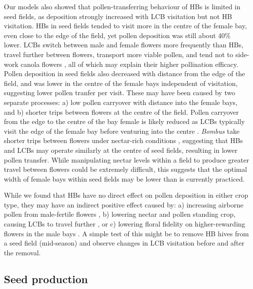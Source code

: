 \documentclass[12pt]{article} %
\begin{document}
Our models also showed that pollen-transferring behaviour of HBs is limited in seed fields, as deposition strongly increased with LCB visitation but not HB visitation.
HBs in seed fields tended to visit more in the centre of the female bay, even close to the edge of the field, yet pollen deposition was still about 40\% lower.
LCBs switch between male and female flowers more frequently than HBs, travel further between flowers, transport more viable pollen, and tend not to side-work canola flowers \citep{soroka2001, parker2015, waytesMsc, brunet2019}, all of which may explain their higher pollination efficacy.
Pollen deposition in seed fields also decreased with distance from the edge of the field, and was lower in the centre of the female bays independent of visitation, suggesting lower pollen tranfer per visit.
These may have been caused by two separate processes: a) low pollen carryover with distance into the female bays, and b) shorter trips between flowers at the centre of the field.
Pollen carryover from the edge to the centre of the bay female is likely reduced as LCBs typically visit the edge of the female bay before venturing into the centre \citep{thomson1986, pinnisch1990}.
\textit{Bombus} take shorter trips between flowers under nectar-rich conditions \citep{pyke1978b, heinrich1979}, suggesting that HBs and LCBs may operate similarly at the centre of seed fields, resulting in lower pollen transfer.
While manipulating nectar levels within a field to produce greater travel between flowers could be extremely difficult, this suggests that the optimal width of female bays within seed fields may be lower than is currently practiced.

While we found that HBs have no direct effect on pollen deposition in either crop type, they may have an indirect positive effect caused by: a) increasing airborne pollen from male-fertile flowers \citet{pierre2010}, b) lowering nectar and pollen standing crop, causing LCBs to travel further \citep{pyke1978b, heinrich1979}, or c) lowering floral fidelity on higher-rewarding flowers in the male bays \citep{mesquida1978, waytesMsc,gaffney2019}.
A simple test of this might be to remove HB hives from a seed field (mid-season) and observe changes in LCB visitation before and after the removal.

\subsection*{Seed production} %
\end{document}
